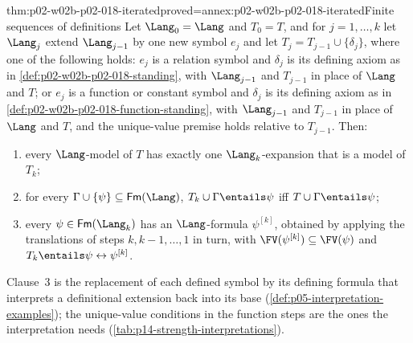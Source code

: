 \begin{hbcorollary}{thm:p02-w02b-p02-018-iterated}{proved=annex:p02-w02b-p02-018-iterated}{Finite sequences of definitions}
Let \(\Lang_0=\Lang\) and \(T_0=T\), and for \(j=1,\ldots,k\) let
\(\Lang_j\) extend \(\Lang_{j-1}\) by one new symbol \(e_j\) and let
\(T_j=T_{j-1}\cup\{\delta_j\}\), where one of the following holds:
\(e_j\) is a relation symbol and \(\delta_j\) is its defining axiom as in
\cref{def:p02-w02b-p02-018-standing}, with \(\Lang_{j-1}\) and \(T_{j-1}\)
in place of \(\Lang\) and \(T\); or \(e_j\) is a function or constant symbol
and \(\delta_j\) is its defining axiom as in
\cref{def:p02-w02b-p02-018-function-standing}, with \(\Lang_{j-1}\) and
\(T_{j-1}\) in place of \(\Lang\) and \(T\), and the unique-value premise
holds relative to \(T_{j-1}\).  Then:
\begin{enumerate}
 \item every \(\Lang\)-model of \(T\) has exactly one \(\Lang_k\)-expansion
       that is a model of \(T_k\);
 \item for every \(\Gamma\cup\{\psi\}\subseteq\mathsf{Fm}(\Lang)\),
       \(T_k\cup\Gamma\entails\psi\) iff \(T\cup\Gamma\entails\psi\);
 \item every \(\psi\in\mathsf{Fm}(\Lang_k)\) has an \(\Lang\)-formula
       \(\psi^{[k]}\), obtained by applying the translations of steps
       \(k,k-1,\ldots,1\) in turn, with
       \(\FV(\psi^{[k]})\subseteq\FV(\psi)\) and
       \(T_k\entails\psi\leftrightarrow\psi^{[k]}\).
\end{enumerate}
\end{hbcorollary}

Clause~3 is the replacement of each defined symbol by its defining formula
that interprets a definitional extension back into its base
(\cref{def:p05-interpretation-examples}); the unique-value conditions in
the function steps are the ones the interpretation needs
(\cref{tab:p14-strength-interpretations}).

